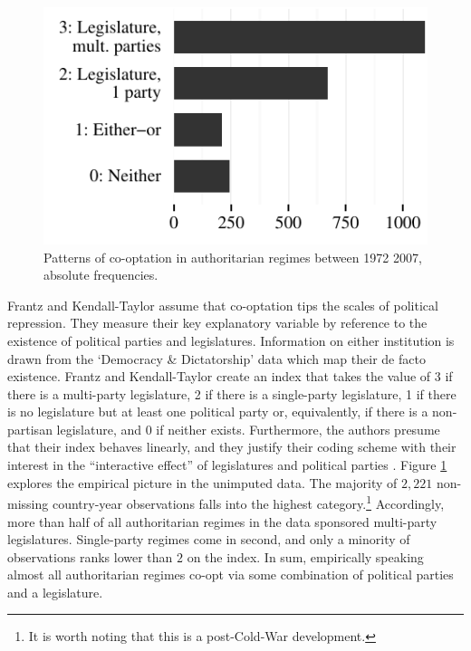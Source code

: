 \begin{figure}
\centering
\includegraphics[width=\linewidth]{./sections/02data/barCooptation.pdf}
\caption{Patterns of co-optation in authoritarian regimes between 1972 2007, absolute frequencies.}
\label{fig:barCooptation}
\end{figure}

Frantz and Kendall-Taylor assume that co-optation tips the 
scales of political repression. They measure their key 
explanatory variable by reference to the existence of 
political parties and legislatures. Information on either 
institution is drawn from the `Democracy \& Dictatorship' 
data \citep{Cheibub.2010} which map their de facto 
existence. Frantz and Kendall-Taylor create an index that 
takes the value of 3 if there is a multi-party legislature, 
2 if there is a single-party legislature, 1 if there is no 
legislature but at least one political party or, 
equivalently, if there is a non-partisan legislature, and 0 
if neither exists. Furthermore, the authors presume that 
their index behaves linearly, and they justify their coding
scheme with their interest in the ``interactive effect''
of legislatures and political parties 
\citep[338]{Frantz.2014}. Figure \ref{fig:barCooptation}
explores the empirical picture in the unimputed data. 
The majority of $2,221$ non-missing country-year 
observations falls into the highest category.\footnote{It is
worth noting that this is a post-Cold-War development.} 
Accordingly, more than half of all authoritarian
regimes in the data sponsored multi-party legislatures. 
Single-party regimes come in second, and only a minority of
observations ranks lower than $2$ on the index. In sum, 
empirically speaking almost all authoritarian regimes 
co-opt via some combination of political parties and a 
legislature.

